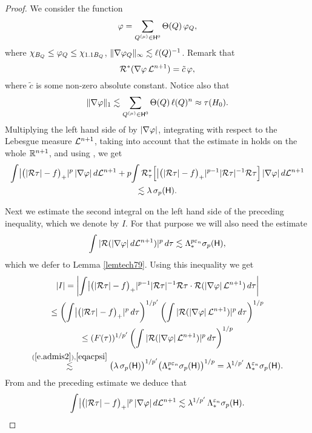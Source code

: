 \begin{proof}
We consider the function
\begin{equation}\label{eqvphi99}
{\varphi} = \sum_{Q^{(\mu)}\in{\mathsf{H}}^0} \Theta(Q)\,{\varphi}_Q,
\end{equation}
where $\chi_{B_Q}\leq {\varphi}_Q\leq \chi_{1.1B_Q}$, $\|\nabla{\varphi}_Q\|_\infty\lesssim\ell(Q)^{-1}$. 
Remark that
$${\mathcal R}^*(\nabla{\varphi}\,{\mathcal L}^{n+1}) = \tilde c\,{\varphi},$$
where $\tilde c$ is some non-zero absolute constant.
Notice also that
\begin{equation}\label{eqnormpsi}
\|\nabla{\varphi}\|_1\lesssim \sum_{Q^{(\mu)}\in{\mathsf{H}}^0} \Theta(Q)\,\ell(Q)^n\approx \tau(H_0).
\end{equation}
Multiplying the left hand side of  by $|\nabla{\varphi}|$, integrating with respect to the Lebesgue measure ${\mathcal L}^{n+1}$, taking into account that the estimate in
 holds on the whole ${\mathbb R}^{n+1}$, and using , we get
\begin{multline}\label{eqpss3}
\int \bigl|\bigl(|{\mathcal R}\tau| - f\bigr)_+|^p\,|\nabla{\varphi}|\,d{\mathcal L}^{n+1} + p\! \int {\mathcal R}_\tau^*\Bigl[\bigl|\bigl(|{\mathcal R}\tau| - f\bigr)_+|^{p-1} |{\mathcal R}\tau|^{-1} {\mathcal R}\tau \Bigr]\,
|\nabla{\varphi}|\,d{\mathcal L}^{n+1}\\
\lesssim \lambda\,\sigma_p({\mathsf{H}}).
\end{multline}

Next we estimate the second integral on the left hand side of the preceding inequality, which we denote by $I$.  For that purpose we will also need the estimate 
\begin{equation}\label{eqacpsi}
\int |{\mathcal R}(|\nabla {\varphi}|\,d{\mathcal L}^{n+1})|^p\,d\tau\lesssim \Lambda_*^{p{\varepsilon}_n}\sigma_p({\mathsf{H}}),
\end{equation}
which we defer to Lemma \ref{lemtech79}.
Using this inequality we get
\begin{multline*}
|I| = \left|\int 
\bigl|\bigl(|\RR\tau| - f\bigr)_+|^{p-1} |\RR\tau|^{-1} \RR\tau \cdot
\RR(|\nabla \vphi|\,\LL^{n+1})\,d\tau\right| \\
\leq \left(\int \bigl|\bigl(|\RR\tau| - f\bigr)_+|^{p} \,d\tau\right)^{1/p'}
\left(\int |\RR(|\nabla \vphi|\,\LL^{n+1})|^p\,d\tau\right)^{1/p}\\
\le (F(\tau))^{1/p'}\left(\int |\RR(|\nabla \vphi|\,\LL^{n+1})|^p\,d\tau\right)^{1/p}\\
 \overset{\rf{e.admis2},\eqref{eqacpsi}}{\lesssim} \bigl (\lambda\,\sigma_p(\sH)\bigr)^{1/p'} \bigl (\Lambda_*^{p\ve_n}\sigma_p(\sH)\bigr)^{1/p} = \lambda^{1/p'}\,\Lambda_*^{\ve_n}\sigma_p(\sH).
\end{multline*}
From  and the preceding estimate we deduce
that
$$\int \bigl|\bigl(|{\mathcal R}\tau| - f\bigr)_+|^p\,|\nabla{\varphi}|\,d{\mathcal L}^{n+1}\lesssim  \lambda^{1/p'}\,\Lambda_*^{{\varepsilon}_n}
\sigma_p({\mathsf{H}}).
$$


\end{proof}
